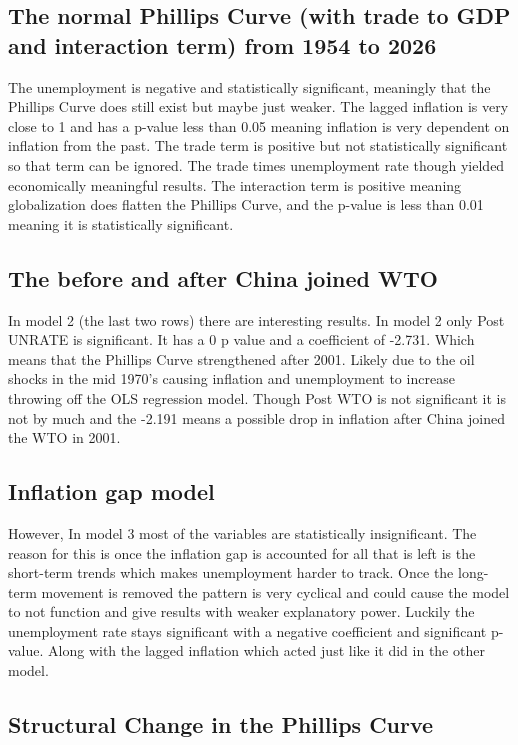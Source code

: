 \documentclass{article}
\begin{document}
\subsection{The normal Phillips Curve (with trade to GDP and interaction term) from 1954 to 2026}
The unemployment is negative and statistically significant, meaningly that the Phillips Curve does still exist but maybe just weaker. The lagged inflation is very close to 1 and has a p-value less than 0.05 meaning inflation is very dependent on inflation from the past. The trade term is positive but not statistically significant so that term can be ignored. The trade times unemployment rate though yielded economically meaningful results. The interaction term is positive meaning globalization does flatten the Phillips Curve, and the p-value is less than 0.01 meaning it is statistically significant. 
\subsection{The before and after China joined WTO}
In model 2 (the last two rows) there are interesting results. In model 2 only Post UNRATE is significant. It has a 0 p value and a coefficient of -2.731. Which means that the Phillips Curve strengthened after 2001. Likely due to the oil shocks in the mid 1970's causing inflation and unemployment to increase throwing off the OLS regression model. Though Post WTO is not significant it is not by much and the -2.191 means a possible drop in inflation after China joined the WTO in 2001.
\subsection{Inflation gap model}
However, In model 3 most of the variables are statistically insignificant. The reason for this is once the inflation gap is accounted for all that is left is the short-term trends which makes unemployment harder to track. Once the long-term movement is removed the pattern is very cyclical and could cause the model to not function and give results with weaker explanatory power. Luckily the unemployment rate stays significant with a negative coefficient and significant p-value. Along with the lagged inflation which acted just like it did in the other model.

\subsection{Structural Change in the Phillips Curve}
\end{document}
